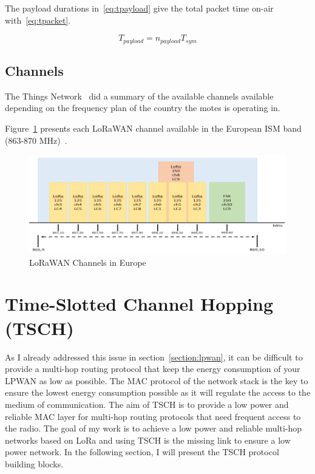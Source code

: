 The payload durations in~\ref{eq:tpayload} give the total packet time on-air
with~\ref{eq:tpacket}.

\begin{equation}
  \label{eq:tpayload}
  T_{payload} = n_{payload} T_{sym}
\end{equation}


\subsection{Channels}

The Things Network~\cite{ttnfrequencyplans} did a summary of the available
channels available depending on the frequency plan of the country the motes is
operating in.

Figure~\ref{fig:channels} presents each LoRaWAN channel available in the
European ISM band (863-870 MHz)~\cite{Polonelli_2019}.

\begin{figure}[H]
  \centering
  \includegraphics[width=\textwidth]{thesis.tex/chapters/context/fig/channels.png}
  \caption{LoRaWAN Channels in Europe\cite{Polonelli_2019}\label{fig:channels}}
\end{figure}


\section{Time-Slotted Channel Hopping (TSCH)}

As I already addressed this issue in section~\ref{section:lpwan}, it can be
difficult to provide a multi-hop routing protocol that keep the energy
consumption of your LPWAN as low as possible.
The MAC protocol of the network stack is the key to ensure the lowest energy
consumption possible as it will regulate the access to the medium of
communication.
The aim of TSCH is to provide a low power and reliable MAC layer for
multi-hop routing protocols that need frequent access to the radio.
The goal of my work is to achieve a low power and reliable multi-hop networks
based on LoRa and using TSCH is the missing link to ensure a low power network.
In the following section, I will present the TSCH protocol building blocks.

